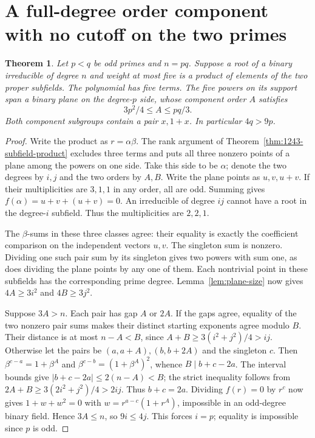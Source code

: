 \documentclass[11pt]{article}
\newtheorem{theorem}{Theorem}
\begin{document}
\clearpage
\section{A full-degree order component with no cutoff on the two primes}
\label{sec:semiprime-parity}

\begin{theorem}\label{thm:semiprime-parity}
Let \(p<q\) be odd primes and \(n=pq\). Suppose a root of a binary
irreducible of degree \(n\) and weight at most five is a product of
elements of the two proper subfields. The polynomial has five terms.
The five powers on its support span a binary plane on the degree-\(p\)
side, whose component order \(A\) satisfies
\[
             3p^2/4\le A\le pq/3.
\]
Both component subgroups contain a pair \(x,1+x\).
In particular \(4q>9p\).
\end{theorem}
\begin{proof}
Write the product as \(r=\alpha\beta\). The rank argument of
Theorem~\ref{thm:1243-subfield-product} excludes three terms and puts
all three nonzero points of a plane among the powers on one side.
Take this side to be \(\alpha\); denote the two degrees by \(i,j\) and
the two orders by \(A,B\). Write the plane points as \(u,v,u+v\).
If their multiplicities are \(3,1,1\) in any order, all are odd.
Summing gives \(f(\alpha)=u+v+(u+v)=0\). An irreducible of degree
\(ij\) cannot have a root in the degree-\(i\) subfield.
Thus the multiplicities are \(2,2,1\).

The \(\beta\)-sums in these three classes agree: their equality is
exactly the coefficient comparison on the independent vectors \(u,v\).
The singleton sum is nonzero. Dividing one such pair sum by its
singleton gives two powers with sum one, as does dividing the plane
points by any one of them. Each nontrivial point in these subfields
has the corresponding prime degree. Lemma~\ref{lem:plane-size} now gives
\(4A\ge3i^2\) and \(4B\ge3j^2\).

Suppose \(3A>n\). Each pair has gap \(A\) or \(2A\). If the gaps
agree, equality of the two nonzero pair sums makes their distinct
starting exponents agree modulo \(B\). Their distance is at most
\(n-A<B\), since \(A+B\ge3(i^2+j^2)/4>ij\).
Otherwise let the pairs be \((a,a+A),(b,b+2A)\) and the singleton
\(c\). Then \(\beta^{c-a}=1+\beta^A\) and
\(\beta^{c-b}=(1+\beta^A)^2\), whence \(B\mid b+c-2a\).
The interval bounds give \(|b+c-2a|\le2(n-A)<B\); the strict
inequality follows from \(2A+B\ge3(2i^2+j^2)/4>2ij\).
Thus \(b+c=2a\). Dividing \(f(r)=0\) by \(r^c\) now gives
\(1+w+w^2=0\) with \(w=r^{a-c}(1+r^A)\), impossible in an odd-degree
binary field. Hence \(3A\le n\), so \(9i\le4j\). This forces
\(i=p\); equality is impossible since \(p\) is odd.
\end{proof}
\end{document}

